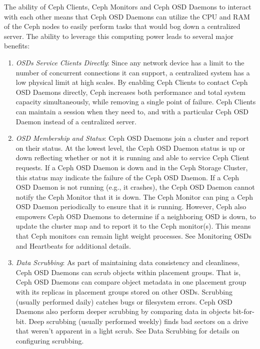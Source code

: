 \documentclass[12pt,a4paper]{report}
\begin{document}
The ability of Ceph Clients, Ceph Monitors and Ceph OSD Daemons to interact
with each other means that Ceph OSD Daemons can utilize the CPU and RAM of the
Ceph nodes to easily perform tasks that would bog down a centralized server.
The ability to leverage this computing power leads to several major benefits:

\begin{enumerate}
	\item \emph{OSDs Service Clients Directly}: Since any network device
		has a limit to the number of concurrent connections it can
		support, a centralized system has a low physical limit at high
		scales. By enabling Ceph Clients to contact Ceph OSD Daemons
		directly, Ceph increases both performance and total system
		capacity simultaneously, while removing a single point of
		failure. Ceph Clients can maintain a session when they need to,
		and with a particular Ceph OSD Daemon instead of a centralized
		server.

	\item \emph{OSD Membership and Status}: Ceph OSD Daemons join a cluster and
		report on their status. At the lowest level, the Ceph OSD Daemon status
		is up or down reflecting whether or not it is running and able to
		service Ceph Client requests. If a Ceph OSD Daemon is down and in the
		Ceph Storage Cluster, this status may indicate the failure of the Ceph
		OSD Daemon. If a Ceph OSD Daemon is not running (e.g., it crashes), the
		Ceph OSD Daemon cannot notify the Ceph Monitor that it is down. The
		Ceph Monitor can ping a Ceph OSD Daemon periodically to ensure that it
		is running. However, Ceph also empowers Ceph OSD Daemons to determine
		if a neighboring OSD is down, to update the cluster map and to report
		it to the Ceph monitor(s). This means that Ceph monitors can remain
		light weight processes. See Monitoring OSDs and Heartbeats for
		additional details.

	\item \emph{Data Scrubbing}: As part of maintaining data consistency
		and cleanliness, Ceph OSD Daemons can scrub objects within
		placement groups. That is, Ceph OSD Daemons can compare object
		metadata in one placement group with its replicas in placement
		groups stored on other OSDs. Scrubbing (usually performed
		daily) catches bugs or filesystem errors. Ceph OSD Daemons also
		perform deeper scrubbing by comparing data in objects
		bit-for-bit. Deep scrubbing (usually performed weekly) finds
		bad sectors on a drive that weren't apparent in a light scrub.
		See Data Scrubbing for details on configuring scrubbing.


\end{enumerate}
\end{document}
